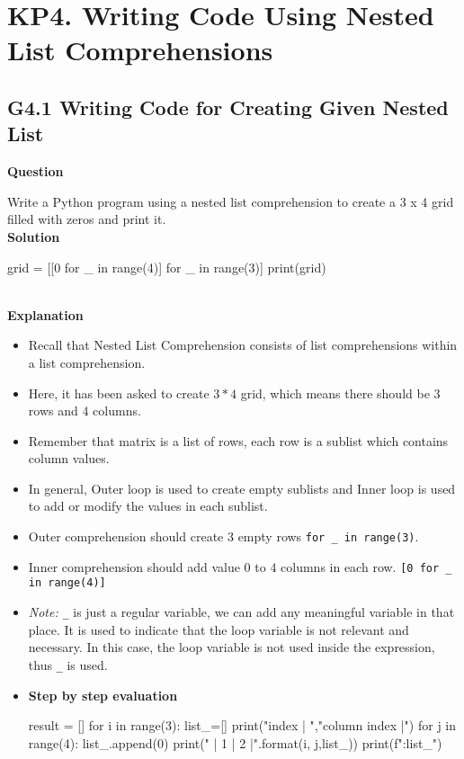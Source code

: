 \documentclass[10pt]{extarticle}
\begin{document}
\section*{KP4. Writing Code Using Nested List Comprehensions}
\subsection*{G4.1 Writing Code for Creating Given Nested List}

\textbf{Question}

Write a Python program using a nested list comprehension to create a 3 x 4 grid filled with zeros and print it. \\

\noindent\textbf{Solution}

\begin{python}
grid = [[0 for _ in range(4)] for _ in range(3)]
print(grid)
\end{python}  \\

\noindent\textbf{Explanation}

\begin{itemize}
    \item Recall that Nested List Comprehension consists of list comprehensions within a list comprehension.
    \item Here, it has been asked to create $ 3*4$ grid, which means there should be $3$ rows and $4$ columns. 
    \item Remember that matrix is a list of rows, each row is a sublist which contains column values.
    \item In general, Outer loop is used to create empty sublists and Inner loop is used to add or modify the values in each sublist. 
    \item Outer comprehension should create $3$ empty rows  \colorbox{gray!20}{\texttt{for \_ in range(3)}}.
    \item Inner comprehension should add value $0$ to $4$ columns in each row.  \colorbox{gray!20}{\texttt{[0 for \_ in range(4)]}} 
    \item \textit{Note:} \texttt{\_} is just a regular variable, we can add any meaningful variable in that place. It is used to indicate that the loop variable is not relevant and necessary. In this case, the loop variable is not used inside the expression, thus \texttt{\_} is used.
    \item \textbf{Step by step evaluation}
    \begin{tcolorbox}[colback=gray!20, colframe=gray!50, sharp corners=southwest]
    \begin{pycode}
result = []
for i in range(3):
  list_=[]
  print("\nrow index | ","column index |")
  for j in range(4):
      list_.append(0)
      print("  |  {1}  |  {2}  |".format(i, j,list_))
  print(f"\nRow:{list_}")   

    \end{pycode}
    \end{tcolorbox}
\end{itemize}
\end{document}
